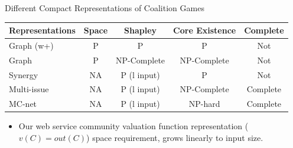 \documentclass{beamer}
\begin{document}
\begin{frame}{Different Compact Representations of Coalition Games}

    \begin{table}
        \small
        \begin{tabular}{l|c|c|c|c}
        Representations                  & Space    & Shapley                  & Core Existence  & Complete     \\ \hline
        Graph (w+)                       & P        & P                        & P               & Not          \\
        Graph                            & P        & NP-Complete              & NP-Complete     & Not          \\
        Synergy                          & NA       & P (l input)              & P               & Not          \\
        Multi-issue                      & NA       & P (l input)              & NP-Complete     & Complete     \\
        MC-net                           & NA       & P (l input)              & NP-hard         & Complete     \\
        \end{tabular}
    \end{table}

    \begin{itemize}
        \item Our web service community valuation function representation ($v(C) = out(C)$) space requirement, grows linearly to input size.
    \end{itemize}

\end{frame}

\end{document}
